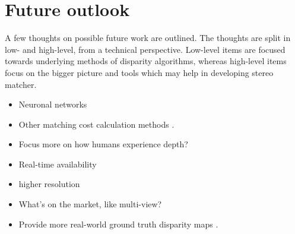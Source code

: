 \section{Future outlook}

A few thoughts on possible future work are outlined.
The thoughts are split in low- and high-level, from a technical perspective.
Low-level items are focused towards underlying methods of disparity algorithms, whereas high-level items focus on the bigger picture and tools which may help in developing stereo matcher.

\begin{itemize}
  \item Neuronal networks \citep{olshausen1996emergence}
  \item Other matching cost calculation methods \citep{hermann2010gradient}.
  \item Focus more on how humans experience depth? \citep{deangelis1995neuronal}
\end{itemize}

\begin{itemize}
  \item Real-time availability
  \item higher resolution
  \item What's on the market, like multi-view?
  \item Provide more real-world ground truth disparity maps \citep{kondermann2015stereo, Geiger2011IV}.
\end{itemize}
